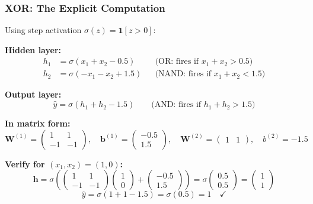 \documentclass[notes,11pt, aspectratio=169]{beamer}
\newcommand{\vb}{\mathbf{b}}
\newcommand{\vh}{\mathbf{h}}
\newcommand{\vW}{\mathbf{W}}
\begin{document}
\begin{frame}
\frametitle{XOR: The Explicit Computation}

Using step activation $\sigma(z) = \mathbf{1}[z > 0]$:

\vspace{4pt}
\textbf{Hidden layer:}
\begin{align*}
    h_1 &= \sigma(x_1 + x_2 - 0.5) && \text{(OR: fires if $x_1 + x_2 > 0.5$)} \\
    h_2 &= \sigma(-x_1 - x_2 + 1.5) && \text{(NAND: fires if $x_1 + x_2 < 1.5$)}
\end{align*}

\textbf{Output layer:}
\[
    \hat{y} = \sigma(h_1 + h_2 - 1.5) \qquad \text{(AND: fires if $h_1 + h_2 > 1.5$)}
\]

\vspace{4pt}
\textbf{In matrix form:}
\[
    \vW^{(1)} = \begin{pmatrix} 1 & 1 \\ -1 & -1 \end{pmatrix}, \quad
    \vb^{(1)} = \begin{pmatrix} -0.5 \\ 1.5 \end{pmatrix}, \quad
    \vW^{(2)} = \begin{pmatrix} 1 & 1 \end{pmatrix}, \quad
    b^{(2)} = -1.5
\]

\vspace{4pt}
\textbf{Verify for $(x_1, x_2) = (1, 0)$:}
\[
    \vh = \sigma\!\left(\begin{pmatrix}1 & 1 \\ -1 & -1\end{pmatrix}\begin{pmatrix}1\\0\end{pmatrix} + \begin{pmatrix}-0.5\\1.5\end{pmatrix}\right) = \sigma\!\begin{pmatrix}0.5\\0.5\end{pmatrix} = \begin{pmatrix}1\\1\end{pmatrix}
\]
\[
    \hat{y} = \sigma(1 + 1 - 1.5) = \sigma(0.5) = 1 \quad \checkmark
\]
\end{frame}


\end{document}
